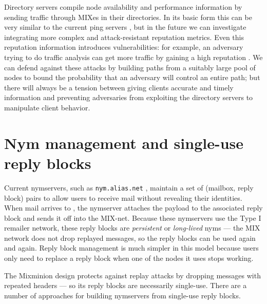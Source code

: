 \documentclass[11pt]{IEEEtran}
\newcommand\emailaddr{\begingroup \def\UrlLeft{<}\def\UrlRight{>}\urlstyle{tt}\Url}
\begin{document}
Directory servers compile node availability and performance information by
sending traffic through MIXes in their directories. In its basic form this
can be very similar to the current ping servers \cite{levien}, but in the
future we can investigate integrating more complex and attack-resistant
reputation metrics.   Even this reputation information introduces
vulnerabilities: for example, an adversary 
trying to do traffic analysis
can get more traffic by gaining a high reputation \cite{mix-acc}. We can
defend against these attacks by building paths from a suitably large pool
of nodes \cite{casc-rep} to bound the probability that an adversary will
control an entire path; but there will always be a tension between giving
clients accurate and timely information and preventing adversaries from
exploiting the directory servers to manipulate client behavior.



\section{Nym management and single-use reply blocks}
\label{sec:nymservers}

Current nymservers, such as {\tt nym.alias.net} \cite{nym-alias-net},
maintain a set of (mailbox, reply block) pairs to allow users to
receive mail without revealing their identities. When mail arrives to
\emailaddr{bob@nym.alias.net}, the nymserver attaches the payload to
the associated
reply block and sends it off into the MIX-net. Because these nymservers
use the Type I remailer network, these reply blocks are \emph{persistent}
or \emph{long-lived} nyms --- the MIX network does not drop replayed
messages, so the reply blocks can be used again and again. Reply block
management is much simpler in this model because users only need to
replace a reply block when one of the nodes it uses stops working.

The Mixminion design protects against replay attacks by dropping
messages with repeated headers --- so its reply blocks are necessarily
single-use. There are a number of approaches for building nymservers
from single-use reply blocks.
\end{document}
